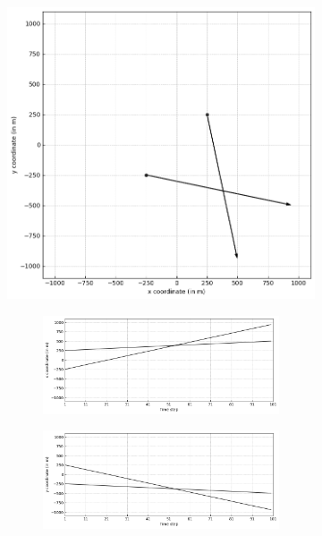 \begin{figure}
    \centering
    \begin{subfigure}[]{0.48\linewidth}
        \centering
        \includegraphics[width=\linewidth]{figures/c1-tracks.png}
    \end{subfigure}
    \hfill
    \begin{subfigure}[]{0.48\linewidth}
        \centering
        \begin{subfigure}[t]{\linewidth}
            \includegraphics[width=\linewidth]{figures/c1-coord-x.png}
        \end{subfigure}
        \vfill\par
        \begin{subfigure}[b]{\linewidth}
            \includegraphics[width=\linewidth]{figures/c1-coord-y.png}

\end{subfigure}
\end{subfigure}
\end{figure}
